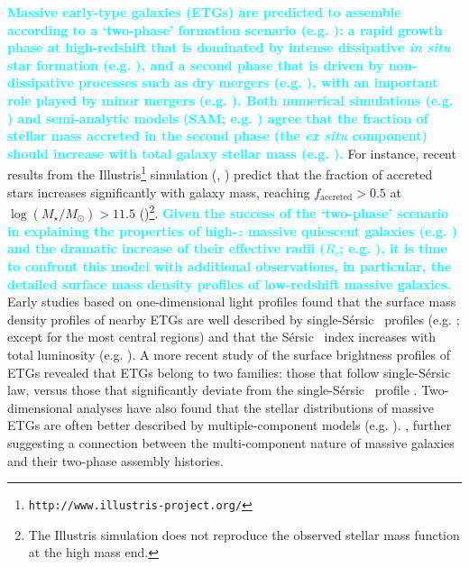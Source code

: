 \documentclass[fleqn,usenatbib]{mnras}
\def\ser{{S\'{e}rsic\ }}
\def\logms{{$\log (M_{\star}/M_{\odot})$}}
\newcommand{\song}[1]{\textcolor{cyan}{\textbf{#1}}}
\begin{document}
    \song{
    Massive early-type galaxies (ETGs) are predicted to assemble according to a 
    `two-phase' formation scenario 
    (e.g. \citealt{Oser2010, Oser2012}): a rapid growth phase at high-redshift that 
    is dominated by intense dissipative \textit{in situ} star formation (e.g.
    \citealt{Hopkins2008, Dekel2009}), and a second phase that 
    is driven by non-dissipative processes such as dry mergers 
    (e.g. \citealt{Naab2006, Khochfar2006}), with an important role played by 
    minor mergers 
    (e.g. \citealt{Hilz2012, Hilz2013, Oogi2013, Bedorf2013, Laporte2013}).
    Both numerical simulations (e.g. \citealt{Oser2010}) and semi-analytic models 
    (SAM; e.g. \citealt{LeeYi2013, LeeYi2017}) agree that the fraction of stellar 
    mass accreted in the second phase (the \textit{ex situ} component) should increase 
    with total galaxy stellar mass (e.g. \citealt{Lackner2012, Cooper2013, Qu2017}).
    }
    For instance, recent results from the 
    Illustris\footnote{\texttt{http://www.illustris-project.org/}} simulation 
    (\citealt{Vogelsberger2014}, \citealt{Genel2014}) predict that the fraction of  
    accreted stars increases significantly with galaxy mass, reaching
    $f_{\mathrm{accreted}}>0.5$ at \logms{}$>11.5$ 
    (\citealt{RodriguezGomez2016})\footnote{The Illustris simulation
    does not reproduce the observed stellar mass function at the high mass end.}. 
    \song{
    Given the success of the `two-phase' scenario in explaining the properties of 
    high-$z$ massive quiescent galaxies (e.g. \citealt{vanDokkum2010, vanderWel2011,
    vandeSande2011, Belli2014}) and the dramatic increase of their effective radii 
    ($R_{\mathrm{e}}$; e.g. \citealt{Newman2012, vdWel2014}), it is time to confront 
    this model with additional observations, in particular, the detailed surface 
    mass density profiles of low-redshift massive galaxies. 
    }
    Early studies based on one-dimensional light profiles found that the surface 
    mass density profiles of nearby ETGs are well described by single-\ser{} profiles 
    (e.g. \citealt{Kormendy2009}; except for the most central regions) and that the 
    \ser{} index increases with total luminosity 
    (e.g. \citealt{Graham2013}). 
    A more recent study of the surface brightness profiles of ETGs 
    revealed that ETGs belong to two families: 
    those that follow single-\ser{} law, versus those that significantly deviate from 
    the single-\ser{} profile \citep{Schombert2015}.  
    Two-dimensional analyses have also found that the stellar distributions of massive 
    ETGs are often better described by multiple-component models 
    (e.g. \citealt{Huang2013a, Oh2017}).  
    \citet{Huang2013b}, further suggesting a connection between the multi-component 
    nature of massive galaxies and their two-phase assembly histories.
    
\end{document}
